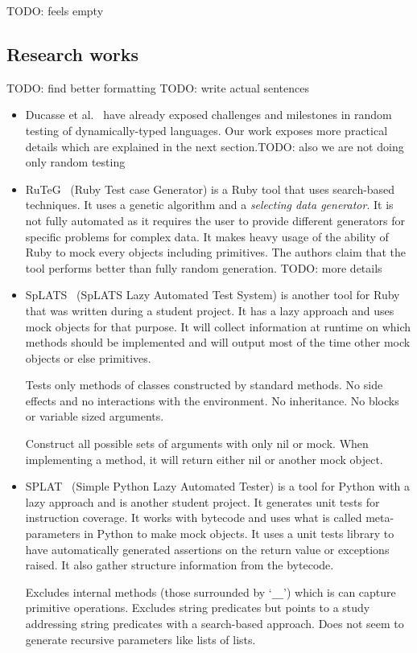\documentclass{llncs2e/llncs}
\makeatletter
\def\todo#1{{\color{red}TODO\@: #1}}
\makeatother
\begin{document}
\todo{feels empty}

\subsection{Research works}
\label{related_research}

\todo{find better formatting}
\todo{write actual sentences}
\begin{itemize}
  \item Ducasse et al.~\cite{ducasse2011challenges} have already exposed
    challenges and milestones in random testing of dynamically-typed languages.
    Our work exposes more practical details which are explained in the next
    section.\todo{also we are not doing only random testing}

  \item RuTeG~\cite{mairhofer2011search} (Ruby Test case Generator) is a Ruby
    tool that uses search-based techniques. It uses a genetic algorithm and a
    \textit{selecting data generator}. It is not fully automated as it requires
    the user to provide different generators for specific problems for complex
    data. It makes heavy usage of the ability of Ruby to mock every objects
    including primitives. The authors claim that the tool performs better than
    fully random generation.  \todo{more details}

  \item SpLATS~\cite{splats} (SpLATS Lazy Automated Test System) is another tool
    for Ruby that was written during a student project. It has a lazy approach
    and uses mock objects for that purpose. It will collect information at
    runtime on which methods should be implemented and will output most of the
    time other mock objects or else primitives.

    Tests only methods of classes constructed by standard methods. No side
    effects and no interactions with the environment. No inheritance. No blocks
    or variable sized arguments.

    Construct all possible sets of arguments with only nil or mock. When
    implementing a method, it will return either nil or another mock object.

  \item SPLAT~\cite{splat} (Simple Python Lazy Automated Tester) is a tool for
    Python with a lazy approach and is another student project. It generates
    unit tests for instruction coverage.  It works with bytecode and uses what
    is called meta-parameters in Python to make mock objects. It uses a unit
    tests library to have automatically generated assertions on the return value
    or exceptions raised. It also gather structure information from the
    bytecode.

    Excludes internal methods (those surrounded by `\texttt{\_\_}') which is
    can capture primitive operations. Excludes string predicates but points to a
    study~\cite{alshraideh2006search} addressing string predicates with a
    search-based approach. Does not seem to generate recursive parameters like
    lists of lists.
\end{itemize}
\end{document}
